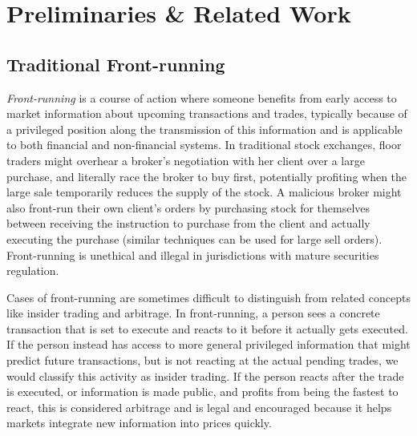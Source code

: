 

\section{Preliminaries \& Related Work}

\subsection{Traditional Front-running}
\label{sec:What is front-running?}

\emph{Front-running} is a course of action where someone benefits from early access to market information about upcoming transactions and trades, typically because of a privileged position along the transmission of this information and is applicable to both financial and non-financial systems. In traditional stock exchanges, floor traders might overhear a broker's negotiation with her client over a large purchase, and literally race the broker to buy first, potentially profiting when the large sale temporarily reduces the supply of the stock. A malicious broker might also front-run their own client's orders by purchasing stock for themselves between receiving the instruction to purchase from the client and actually executing the purchase (similar techniques can be used for large sell orders). Front-running is unethical and illegal in jurisdictions with mature securities regulation.

Cases of front-running are sometimes difficult to distinguish from related concepts like insider trading and arbitrage. In front-running, a person sees a concrete transaction that is set to execute and reacts to it before it actually gets executed. If the person instead has access to more general privileged information that might predict future transactions, but is not reacting at the actual pending trades, we would classify this activity as insider trading. If the person reacts after the trade is executed, or information is made public, and profits from being the fastest to react, this is considered arbitrage and is legal and encouraged because it helps markets integrate new information into prices quickly.


